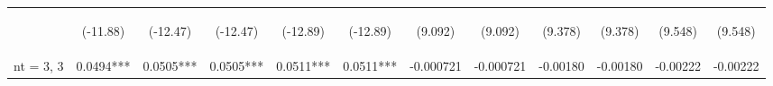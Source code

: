 \documentclass[]{article}
\begin{document}
\begin{center}
\begin{tabular}{lccccccccccc}
        \vspace{4pt}     & \begin{footnotesize}(-11.88)\end{footnotesize} & \begin{footnotesize}(-12.47)\end{footnotesize} & \begin{footnotesize}(-12.47)\end{footnotesize} & \begin{footnotesize}(-12.89)\end{footnotesize} & \begin{footnotesize}(-12.89)\end{footnotesize} & \begin{footnotesize}(9.092)\end{footnotesize}   & \begin{footnotesize}(9.092)\end{footnotesize}   & \begin{footnotesize}(9.378)\end{footnotesize}  & \begin{footnotesize}(9.378)\end{footnotesize}  & \begin{footnotesize}(9.548)\end{footnotesize}  & \begin{footnotesize}(9.548)\end{footnotesize}  \\
        nt = 3, 3        & 0.0494***                                      & 0.0505***                                      & 0.0505***                                      & 0.0511***                                      & 0.0511***                                      & -0.000721                                       & -0.000721                                       & -0.00180                                       & -0.00180                                       & -0.00222                                       & -0.00222                                       \\

\end{tabular}
\end{center}
\end{document}
